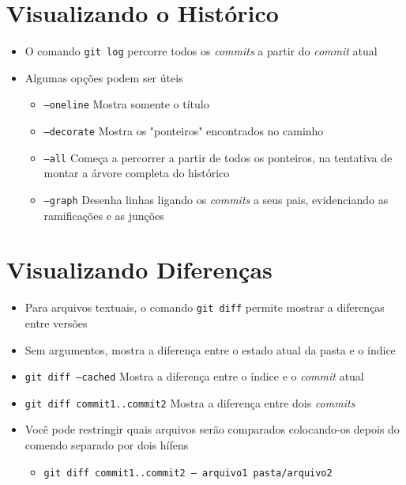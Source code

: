 \documentclass{beamer}
\newenvironment{slide}{\begin{frame}{\insertsection}}{\end{frame}}
\begin{document}
\section{Visualizando o Histórico}
\begin{slide}
    \begin{itemize}
        \item O comando \texttt{git log} percorre todos os \emph{commits} a
            partir do \emph{commit} atual
        \pause
        \item Algumas opções podem ser úteis
        \begin{itemize}
            \pause
            \item \texttt{--oneline} Mostra somente o título
            \pause
            \item \texttt{--decorate} Mostra os "ponteiros" encontrados no
                caminho
            \pause
            \item \texttt{--all} Começa a percorrer a partir de todos os
                ponteiros, na tentativa de montar a árvore completa do histórico
            \pause
            \item \texttt{--graph} Desenha linhas ligando os \emph{commits} a
                seus pais, evidenciando as ramificações e as junções
        \end{itemize}
    \end{itemize}
\end{slide}

\section{Visualizando Diferenças}
\begin{slide}
    \begin{itemize}
        \item Para arquivos textuais, o comando \texttt{git diff} permite
            mostrar a diferenças entre versões
        \pause
        \item Sem argumentos, mostra a diferença entre o estado atual da pasta
            e o índice
        \pause
        \item \texttt{git diff --cached} Mostra a diferença entre o índice e o
            \emph{commit} atual
        \pause
        \item \texttt{git diff commit1..commit2} Mostra a diferença entre dois
            \emph{commits}
        \pause
        \item Você pode restringir quais arquivos serão comparados colocando-os
            depois do comendo separado por dois hífens
            \begin{itemize}
                \pause
                \item \texttt{git diff commit1..commit2 -- arquivo1
                    pasta/arquivo2}
            \end{itemize}
    \end{itemize}
\end{slide}
\end{document}
